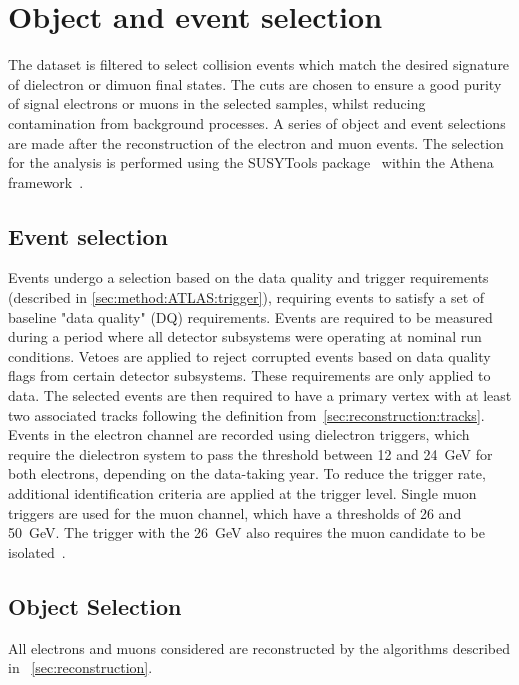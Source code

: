 \chapter{Object and event selection}\label{chap:eventsel}
The dataset is filtered to select collision events which match the desired signature of dielectron or dimuon final states. The cuts are chosen to ensure a good purity of signal electrons or muons in the selected samples, whilst reducing contamination from background processes. A series of object and event selections are made after the reconstruction of the electron and muon events. The selection for the analysis is performed using the SUSYTools package~\cite{SUSYTools} within the Athena framework~\cite{Athena}.

\section{Event selection}\label{sec:selevent}
Events undergo a selection based on the data quality and trigger requirements (described in \cref{sec:method:ATLAS:trigger}), requiring events to satisfy a set of baseline "data quality" (DQ) requirements. Events are required to be measured during a period where all detector subsystems were operating at nominal run conditions. Vetoes are applied to reject corrupted events based on data quality flags from certain detector subsystems. These requirements are only applied to data. The selected events are then required to have a primary vertex with at least two associated tracks following the definition from~\cref{sec:reconstruction:tracks}. Events in the electron channel are recorded using dielectron triggers, which require the dielectron system to pass the \et threshold between 12 and \SI{24}{\giga\electronvolt} for both electrons, depending on the data-taking year. To reduce the trigger rate, additional identification criteria are applied at the trigger level. Single muon triggers are used for the muon channel, which have a \pt thresholds of 26 and \SI{50}{\giga\electronvolt}. The trigger with the \SI{26}{\giga\electronvolt} also requires the muon candidate to be isolated~\cite{Aaboud:2016leb}.

\section{Object Selection}\label{sec:selobejct}
All electrons and muons considered are reconstructed by the algorithms described in  ~\cref{sec:reconstruction}. 

